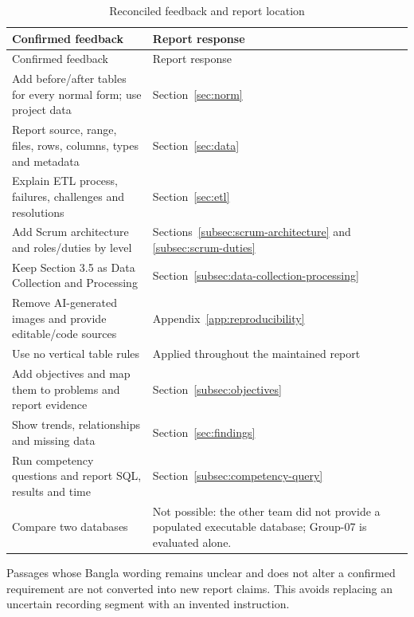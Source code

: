 \begin{longtable}{L{0.40\textwidth}L{0.45\textwidth}}
\caption{Reconciled feedback and report location}
\label{tab:feedback-checklist}\\
\toprule
Confirmed feedback & Report response \\
\midrule
\endfirsthead
\toprule
Confirmed feedback & Report response \\
\midrule
\endhead
\bottomrule
\endfoot
Add before/after tables for every normal form; use project data &
Section~\ref{sec:norm} \\
Report source, range, files, rows, columns, types and metadata &
Section~\ref{sec:data} \\
Explain ETL process, failures, challenges and resolutions &
Section~\ref{sec:etl} \\
Add Scrum architecture and roles/duties by level &
Sections~\ref{subsec:scrum-architecture} and \ref{subsec:scrum-duties} \\
Keep Section 3.5 as Data Collection and Processing &
Section~\ref{subsec:data-collection-processing} \\
Remove AI-generated images and provide editable/code sources &
Appendix~\ref{app:reproducibility} \\
Use no vertical table rules & Applied throughout the maintained report \\
Add objectives and map them to problems and report evidence &
Section~\ref{subsec:objectives} \\
Show trends, relationships and missing data &
Section~\ref{sec:findings} \\
Run competency questions and report SQL, results and time &
Section~\ref{subsec:competency-query} \\
Compare two databases & Not possible: the other team did not provide a
populated executable database; Group-07 is evaluated alone. \\
\end{longtable}

Passages whose Bangla wording remains unclear and does not alter a confirmed
requirement are not converted into new report claims. This avoids replacing an
uncertain recording segment with an invented instruction.
